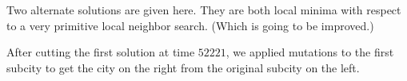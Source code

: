 \documentclass{article}
\begin{document}

Two alternate solutions are given here.
They are both local minima with respect to a very primitive local neighbor search.
(Which is going to be improved.)


After cutting the first solution at time $52221$, we applied mutations to the first subcity to get the city on the right from the original subcity on the left.
\end{document}
